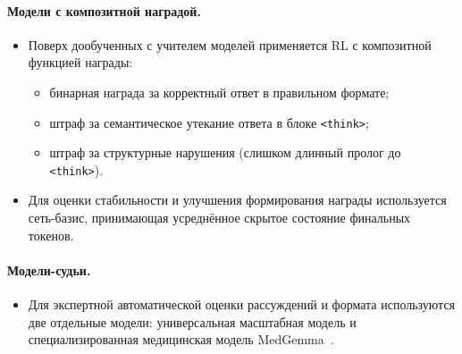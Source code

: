 \paragraph{Модели с композитной наградой.}
    \begin{itemize}
        \item Поверх дообученных с учителем моделей применяется RL 
        с композитной функцией награды:
        \begin{itemize}
            \item бинарная награда за корректный ответ в правильном формате;
            \item штраф за семантическое утекание ответа в блоке \verb|<think>|;
            \item штраф за структурные нарушения (слишком длинный 
            пролог до \verb|<think>|).
        \end{itemize}
        \item Для оценки стабильности и улучшения формирования награды 
        используется сеть-базис, принимающая усреднённое скрытое 
        состояние финальных токенов.
    \end{itemize}

\paragraph{Модели-судьи.}
    \begin{itemize}
        \item Для экспертной автоматической оценки рассуждений и формата 
        используются две отдельные модели: универсальная масштабная модель 
        и специализированная медицинская модель MedGemma~\cite{medgemma2025}.
    \end{itemize}